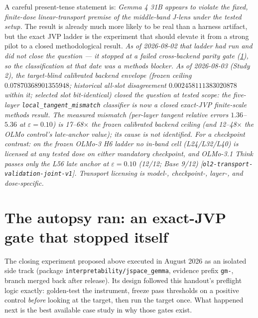 \documentclass[11pt]{article}
\newcommand{\eps}{\varepsilon}
\theoremstyle{definition}
\theoremstyle{remark}
\begin{document}
\begin{resultbox}
A careful present-tense statement is: \emph{Gemma 4 31B appears to violate the fixed, finite-dose linear-transport premise of the middle-band J-lens under the tested setup.} The result is already much more likely to be real than a harness artifact, but the exact JVP ladder is the experiment that should elevate it from a strong pilot to a closed methodological result. \emph{As of 2026-08-02 that ladder had run and did not close the question --- it stopped at a failed cross-backend parity gate (\cref{sec:autopsy-ran}), so the classification at that date was a methods blocker.} \emph{As of 2026-08-03 (Study 2), the target-blind calibrated backend envelope (frozen ceiling $0.07870368901355948$; historical all-slot disagreement $0.002458111383020878$ within it; selected slot bit-identical) closed the question at tested scope: the five-layer \texttt{local\_tangent\_mismatch} classifier is now a closed exact-JVP finite-scale methods result. The measured mismatch (per-layer tangent relative errors $1.36$--$5.36$ at $\eps=0.10$) is 17--68$\times$ the frozen calibrated backend ceiling (and 12--48$\times$ the OLMo control's late-anchor value); its cause is not identified. For a checkpoint contrast: on the frozen OLMo-3 H6 ladder no in-band cell (L24/L32/L40) is licensed at any tested dose on either mandatory checkpoint, and OLMo-3.1 Think passes only the L56 late anchor at $\eps=0.10$ (12/12; Base 9/12) [\texttt{ol2-transport-validation-joint-v1}]. Transport licensing is model-, checkpoint-, layer-, and dose-specific.}
\end{resultbox}

\section{The autopsy ran: an exact-JVP gate that stopped itself}\label{sec:autopsy-ran}

The closing experiment proposed above executed in August 2026 as an isolated
side track (package \texttt{interpretability/jspace\_gemma}, evidence prefix
\texttt{gm-}, branch merged back after release). Its design followed this
handout's preflight logic exactly: golden-test the instrument, freeze pass
thresholds on a positive control \emph{before} looking at the target, then run
the target once. What happened next is the best available case study in why
those gates exist.
\end{document}
